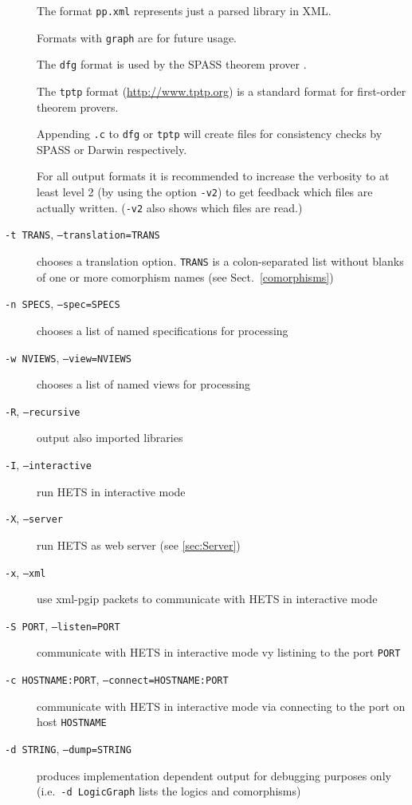 \documentclass{article}
\newcommand{\normalTEXTSC}[2]{{#1\scriptsize#2}}
\newcommand     {\Hets}{\normalTEXTSC{H}{ETS}\xspace}
\newcommand     {\SPASS}{\normalTEXTSC{S}{PASS}\xspace}
\begin{document}
\begin{description}
The format \texttt{pp.xml} represents just a parsed library in XML.

Formats with \texttt{graph} are for future usage.

The \texttt{dfg} format is used by the \SPASS theorem prover
\cite{WeidenbachEtAl02}.

The \texttt{tptp} format (\url{http://www.tptp.org}) is a standard
format for first-order theorem provers.

Appending \texttt{.c} to \texttt{dfg} or \texttt{tptp} will create files for
consistency checks by SPASS or Darwin respectively.

For all output formats it is recommended to increase the verbosity to at least
level 2 (by using the option \texttt{-v2}) to get feedback which files are
actually written. (\texttt{-v2} also shows which files are read.)

\item[\texttt{-t TRANS}, \texttt{--translation=TRANS}]
chooses a translation option. \texttt{TRANS} is a colon-separated list
without blanks of one or more comorphism names (see Sect.~\ref{comorphisms})

\item[\texttt{-n SPECS}, \texttt{--spec=SPECS}]
chooses a list of named specifications for processing

\item[\texttt{-w NVIEWS}, \texttt{--view=NVIEWS}]
chooses a list of named views for processing

\item[\texttt{-R}, \texttt{--recursive}] output also imported libraries

\item[\texttt{-I}, \texttt{--interactive}] run \Hets in interactive mode

\item[\texttt{-X}, \texttt{--server}] run \Hets as web server (see
  \ref{sec:Server})

\item[\texttt{-x}, \texttt{--xml}] use xml-pgip packets to communicate with
  \Hets in interactive mode

\item[\texttt{-S PORT}, \texttt{--listen=PORT}] communicate
  with \Hets in interactive mode vy listining to the port \texttt{PORT}

\item[\texttt{-c HOSTNAME:PORT}, \texttt{--connect=HOSTNAME:PORT}] communicate
  with \Hets in interactive mode via connecting to the port on host
  \texttt{HOSTNAME}

\item[\texttt{-d STRING}, \texttt{--dump=STRING}] produces implementation
  dependent output for debugging purposes only
  (i.e.\ \texttt{-d LogicGraph} lists the logics and comorphisms)
\end{description}
\end{document}
